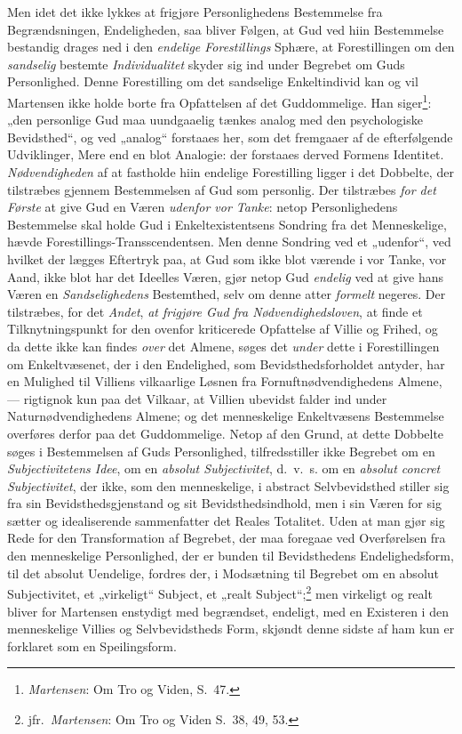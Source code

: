 \documentclass[12pt,a4paper]{book}
\newcommand{\opage}[1]{\marginnote{\footnotesize\textit{[#1]}}}
\begin{document}
Men idet det ikke lykkes at frigjøre Personlighedens Bestemmelse fra
Begrændsningen, Endeligheden, saa bliver Følgen, at Gud ved hiin Bestemmelse
bestandig drages ned i den \emph{endelige Forestillings} Sphære, at Forestillingen om den
\emph{sandselig} bestemte \emph{Individualitet} skyder sig ind under Begrebet om Guds
Personlighed. Denne Forestilling om det sandselige Enkeltindivid kan og vil
Martensen ikke holde borte fra Opfattelsen af det Guddommelige. Han
siger\footnote{\emph{Martensen}: Om Tro og Viden, S.\ 47.}: „den personlige Gud maa
uundgaaelig tænkes analog med den psychologiske Bevidsthed“, og ved „analog“
forstaaes her, som det fremgaaer af de efterfølgende Udviklinger, Mere end en blot
Analogie: der forstaaes derved Formens Identitet. \emph{Nødvendigheden} af at fastholde
hiin endelige Forestilling ligger i det Dobbelte, der tilstræbes gjennem
Bestemmelsen af Gud som personlig. Der tilstræbes \emph{for det Første} at give Gud en
Væren \emph{udenfor vor Tanke}: netop Personlighedens Bestemmelse skal holde Gud i
Enkeltexistentsens Sondring fra det Men\opage{69}neskelige, hævde
Forestillings-Transscendentsen. Men denne Sondring ved et „udenfor“, ved hvilket
der lægges Eftertryk paa, at Gud som ikke blot værende i vor Tanke, vor Aand, ikke
blot har det Ideelles Væren, gjør netop Gud \emph{endelig} ved at give hans Væren
en \emph{Sandselighedens} Bestemthed, selv om denne atter \emph{formelt} negeres. Der
tilstræbes, for det \emph{Andet}, \emph{at frigjøre Gud fra Nødvendighedsloven}, at finde
et Tilknytningspunkt for den ovenfor kriticerede Opfattelse af Villie og Frihed, og
da dette ikke kan findes \emph{over} det Almene, søges det \emph{under} dette i
Forestillingen om Enkeltvæsenet, der i den Endelighed, som Bevidsthedsforholdet
antyder, har en Mulighed til Villiens vilkaarlige Løsnen fra
Fornuftnødvendighedens Almene, --- rigtignok kun paa det Vilkaar, at Villien
ubevidst falder ind under Naturnødvendighedens Almene; og det menneskelige
Enkeltvæsens Bestemmelse overføres derfor paa det Guddommelige. Netop af den Grund,
at dette Dobbelte søges i Bestemmelsen af Guds Personlighed, tilfredsstiller ikke
Begrebet om en \emph{Subjectivitetens Idee}, om en \emph{absolut Subjectivitet}, d.\ v.\ s. om en \emph{absolut concret Subjectivitet}, der ikke, som den menneskelige, i abstract
Selvbevidsthed stiller sig fra sin Bevidsthedsgjenstand og sit Bevidsthedsindhold,
men i sin Væren for sig sætter og idealiserende sammenfatter det Reales Totalitet.
Uden at man gjør sig Rede for den Transformation af Begrebet, der maa foregaae ved
Overførelsen fra den menneskelige Personlighed, der er bunden til Bevidsthedens
Endelighedsform, til det absolut Uendelige, fordres der, i Modsætning til Begrebet
om en absolut Subjectivitet, et „virkeligt“ Subject, et „realt
Subject“;\footnote{jfr.\ \emph{Martensen}: Om Tro og Viden S.\ 38, 49, 53.} men virkeligt
og realt bliver for Martensen enstydigt med begrændset, endeligt, med en Existeren i
den menneskelige Villies og Selvbevidstheds Form, skjøndt denne sidste af ham kun er
forklaret som en Speilingsform.
\end{document}
